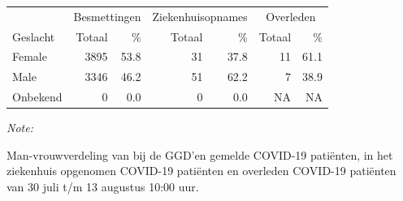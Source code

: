\documentclass[
  english,
  man,floatsintext]{apa6}
\begin{document}
\begin{table}[H]
\centering\begingroup\fontsize{11}{13}\selectfont

\begin{threeparttable}
\begin{tabular}{lrrrrrr}
\toprule
\multicolumn{1}{c}{ } & \multicolumn{2}{c}{Besmettingen} & \multicolumn{2}{c}{Ziekenhuisopnames} & \multicolumn{2}{c}{Overleden} \\
\cmidrule(l{3pt}r{3pt}){2-3} \cmidrule(l{3pt}r{3pt}){4-5} \cmidrule(l{3pt}r{3pt}){6-7}
Geslacht & Totaal & \% & Totaal & \% & Totaal & \%\\
\midrule
Female & 3895 & 53.8 & 31 & 37.8 & 11 & 61.1\\
Male & 3346 & 46.2 & 51 & 62.2 & 7 & 38.9\\
Onbekend & 0 & 0.0 & 0 & 0.0 & NA & NA\\
\bottomrule
\end{tabular}
\begin{tablenotes}
\item \textit{Note: } 
\item Man-vrouwverdeling van bij de GGD’en gemelde COVID-19 patiënten, in het ziekenhuis opgenomen COVID-19 patiënten en overleden COVID-19 patiënten van 30 juli t/m 13 augustus 10:00 uur.
\end{tablenotes}
\end{threeparttable}
\endgroup{}
\end{table}
\newpage
\end{document}
